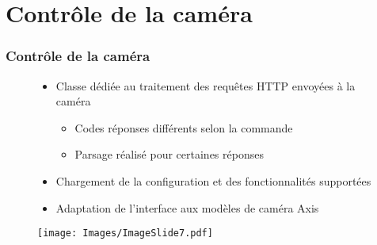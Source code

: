 
\section{Contrôle de la caméra}
  \begin{frame}
   \frametitle{Contrôle de la caméra}


\begin{figure}[H]
  \centering
     \begin{itemize}
    \item Classe dédiée au traitement des requêtes HTTP envoyées à la caméra
    \begin{itemize}
      \item Codes réponses différents selon la commande
      \item Parsage réalisé pour certaines réponses
    \end{itemize}
    \item Chargement de la configuration et des fonctionnalités supportées
    \item Adaptation de l'interface aux modèles de caméra Axis
   	\end{itemize}
   \texttt{[image: Images/ImageSlide7.pdf]}
  \end{figure}  

  \end{frame}
